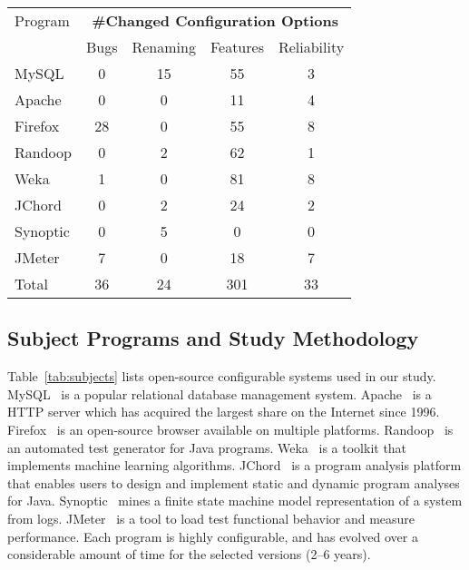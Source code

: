 \begin{table}[t]
\vspace{1mm}
\centering
\small{
\setlength{\tabcolsep}{.50\tabcolsep}
\begin{tabular}{|l|c|c|c|c|}
\hline
 Program & \multicolumn{4}{|c|}{\textbf{\#Changed Configuration Options}} \\
 \cline{2-5}
 & Bugs & Renaming & Features & Reliability \\
 \hline
 \hline
 MySQL & 0 & 15 & 55 & 3 \\
 Apache& 0 & 0 & 11 & 4 \\
 Firefox& 28 & 0 & 55 & 8 \\
 Randoop & 0  & 2 & 62  & 1\\
 Weka & 1  & 0 & 81  & 8 \\
 JChord & 0  & 2 & 24 & 2\\ %
 Synoptic & 0 &  5 & 0 & 0\\
 JMeter & 7  & 0 & 18 & 7 \\
\hline
\hline
 Total & 36 & 24 & 301 & 33 \\
\hline
\end{tabular}
}
\vspace{-2mm}
\end{table}


\subsection{Subject Programs and Study Methodology}


Table~\ref{tab:subjects} lists
\studysubjnum open-source configurable systems used in our
study.
MySQL~\cite{mysql}  is a popular relational database management
system. Apache~\cite{apache} is a HTTP server which has acquired
the largest share on the Internet since 1996. Firefox~\cite{firefox}
is an open-source browser available on multiple platforms.
Randoop~\cite{randoop} is an automated test generator for Java
programs. Weka~\cite{weka} is a toolkit that implements machine
learning algorithms. JChord~\cite{jchord} is a program analysis platform that
enables users to design and implement static and
dynamic program analyses for Java. Synoptic~\cite{synoptic} mines a
finite state machine model representation of a system from
logs. JMeter~\cite{jmeter} is a tool to load test functional
behavior and measure performance.
Each program is highly configurable, and has evolved over
a considerable amount of time for the selected versions ({2--6} years).


